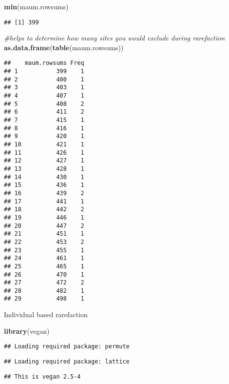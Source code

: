 \documentclass[]{article}
\newenvironment{Shaded}{\begin{snugshade}}{\end{snugshade}}
\newcommand{\KeywordTok}[1]{\textcolor[rgb]{0.13,0.29,0.53}{\textbf{#1}}}
\newcommand{\CommentTok}[1]{\textcolor[rgb]{0.56,0.35,0.01}{\textit{#1}}}
\newcommand{\NormalTok}[1]{#1}
\begin{document}
\begin{Shaded}
\begin{Highlighting}[]
\KeywordTok{min}\NormalTok{(maum.rowsums)}
\end{Highlighting}
\end{Shaded}

\begin{verbatim}
## [1] 399
\end{verbatim}

\begin{Shaded}
\begin{Highlighting}[]
\CommentTok{#helps to determine how many sites you would exclude during rarefaction}
\KeywordTok{as.data.frame}\NormalTok{(}\KeywordTok{table}\NormalTok{(maum.rowsums))}
\end{Highlighting}
\end{Shaded}

\begin{verbatim}
##    maum.rowsums Freq
## 1           399    1
## 2           400    1
## 3           403    1
## 4           407    1
## 5           408    2
## 6           411    2
## 7           415    1
## 8           416    1
## 9           420    1
## 10          421    1
## 11          426    1
## 12          427    1
## 13          428    1
## 14          430    1
## 15          436    1
## 16          439    2
## 17          441    1
## 18          442    2
## 19          446    1
## 20          447    2
## 21          451    1
## 22          453    2
## 23          455    1
## 24          461    1
## 25          465    1
## 26          470    1
## 27          472    2
## 28          482    1
## 29          498    1
\end{verbatim}

Individual based rarefaction

\begin{Shaded}
\begin{Highlighting}[]
\KeywordTok{library}\NormalTok{(vegan)}
\end{Highlighting}
\end{Shaded}

\begin{verbatim}
## Loading required package: permute
\end{verbatim}

\begin{verbatim}
## Loading required package: lattice
\end{verbatim}

\begin{verbatim}
## This is vegan 2.5-4
\end{verbatim}
\end{document}
